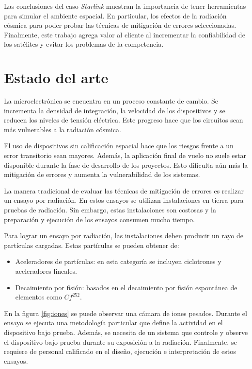 Las conclusiones del caso \emph{Starlink} muestran la importancia de tener herramientas para simular el ambiente espacial.
En particular, los efectos de la radiación cósmica para poder probar las técnicas de mitigación de errores seleccionadas.
Finalmente, este trabajo agrega valor al cliente al incrementar la confiabilidad de los satélites y evitar los problemas de la competencia.

\section{Estado del arte}
\label{sec:arte}

La microelectrónica se encuentra en un proceso constante de cambio.
Se incrementa la densidad de integración, la velocidad de los dispositivos y se reducen los niveles de tensión eléctrica.
Este progreso hace que los circuitos sean más vulnerables a la radiación cósmica.

El uso de dispositivos sin calificación espacial hace que los riesgos frente a un error transitorio sean mayores.
Además, la aplicación final de vuelo no suele estar disponible durante la fase de desarrollo de los proyectos.
Esto dificulta aún más la mitigación de errores y aumenta la vulnerabilidad de los sistemas.

La manera tradicional de evaluar las técnicas de mitigación de errores es realizar un ensayo por radiación.
En estos ensayos se utilizan instalaciones en tierra para pruebas de radiación.
Sin embargo, estas instalaciones son costosas y la preparación y ejecución de los ensayos consumen mucho tiempo.

Para lograr un ensayo por radiación, las instalaciones deben producir un rayo de partículas cargadas.
Estas partículas se pueden obtener de:
\begin{itemize}
    \item Aceleradores de partículas: en esta categoría se incluyen ciclotrones y aceleradores lineales.
    \item Decaimiento por fisión: basados en el decaimiento por fisión espontánea de elementos como $Cf^{252}$.
\end{itemize}

En la figura \ref{fig:iones} se puede observar una cámara de iones pesados.
Durante el ensayo se ejecuta una metodología particular que define la actividad en el dispositivo bajo prueba.
Además, se necesita de un sistema que controle y observe el dispositivo bajo prueba durante su exposición a la radiación.
Finalmente, se requiere de personal calificado en el diseño, ejecución e interpretación de estos ensayos.

